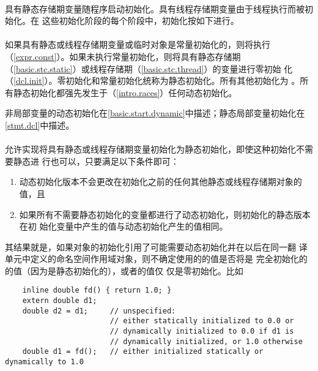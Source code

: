 \paragraph{} %
具有静态存储期变量随程序启动初始化。具有线程存储期变量由于线程执行而被初始化。在
这些初始化阶段的每个阶段中，初始化按如下进行。

\paragraph{} %
如果具有静态或线程存储期变量或临时对象是常量初始化的，则将执行
（\ref{expr.const}）。如果未执行常量初始化，则将具有静态存储期
（\ref{basic.stc.static}）或线程存储期（\ref{basic.stc.thread}）的变量进行零初始
化（\ref{dcl.init}）。零初始化和常量初始化统称为静态初始化。所有其他初始化为
。所有静态初始化都强先发生于（\ref{intro.races}）任何动态初始化。

\begin{note}
  非局部变量的动态初始化在\ref{basic.start.dynamic}中描述；静态局部变量初始化在
  \ref{stmt.dcl}中描述。
\end{note}

\paragraph{} %
允许实现将具有静态或线程存储期变量初始化为静态初始化，即使这种初始化不需要静态进
行也可以，只要满足以下条件即可：
\begin{enumerate}
  \item 动态初始化版本不会更改在初始化之前的任何其他静态或线程存储期对象的值，且
  \item 如果所有不需要静态初始化的变量都进行了动态初始化，则初始化的静态版本在初
        始化变量中产生的值与动态初始化产生的值相同。
\end{enumerate}
\begin{note}
  其结果就是，如果对象的初始化引用了可能需要动态初始化并在以后在同一翻
  译单元中定义的命名空间作用域对象，则不确定使用的的值是否将是
  完全初始化的的值（因为是静态初始化的），或者的值仅
  仅是零初始化。比如
  \begin{lstlisting}
    inline double fd() { return 1.0; }
    extern double d1;
    double d2 = d1;     // unspecified:
                        // either statically initialized to 0.0 or
                        // dynamically initialized to 0.0 if d1 is
                        // dynamically initialized, or 1.0 otherwise
    double d1 = fd();   // either initialized statically or dynamically to 1.0
  \end{lstlisting}
\end{note}
